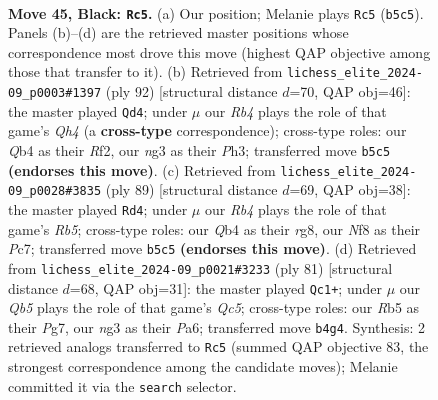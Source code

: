\documentclass[11pt]{article}
\begin{document}
\clearpage

\begin{figure}[p]\centering
\begin{subfigure}{0.46\textwidth}\centering
\resizebox{\linewidth}{!}{%
\newchessgame
\chessboard[
  setfen={3Q1nk1/1p5p/8/1r5p/1q6/6NK/R7/7R b - - 3 45},
  showmover=false,
  pgfstyle=straightmove, color=movearrow, markmove={b5-c5}
]}
\caption{}
\end{subfigure}\hfill
\begin{subfigure}{0.46\textwidth}\centering
\resizebox{\linewidth}{!}{%
\newchessgame
\chessboard[
  setfen={5rk1/6r1/2qpp3/8/2P4Q/5NPP/5RK1/8 w - - 3 47},
  showmover=false,
  pgfstyle=straightmove, color=movearrow, markmove={h4-d4}
]}
\caption{}
\end{subfigure}
\\[4pt]
\begin{subfigure}{0.46\textwidth}\centering
\resizebox{\linewidth}{!}{%
\newchessgame
\chessboard[
  setfen={6R1/1kpQN3/8/p1q1p3/1r2P3/8/6PK/8 b - - 16 45},
  showmover=false,
  pgfstyle=straightmove, color=movearrow, markmove={b4-d4}
]}
\caption{}
\end{subfigure}\hfill
\begin{subfigure}{0.46\textwidth}\centering
\resizebox{\linewidth}{!}{%
\newchessgame
\chessboard[
  setfen={8/1p4pk/p3Q3/3p4/2q5/8/1R1K1P2/7r b - - 11 41},
  showmover=false,
  pgfstyle=straightmove, color=movearrow, markmove={c4-c1}
]}
\caption{}
\end{subfigure}
\caption{\textbf{Move 45, Black: \texttt{Rc5}.} (a) Our position; Melanie plays \texttt{Rc5} (\texttt{b5c5}). Panels (b)--(d) are the retrieved master positions whose correspondence most drove this move (highest QAP objective among those that transfer to it). (b) Retrieved from \texttt{lichess\_elite\_2024-09\_p0003\#1397} (ply 92) [structural distance $d$=70, QAP obj=46]: the master played \texttt{Qd4}; under $\mu$ our \emph{Rb4} plays the role of that game's \emph{Qh4} (a \textbf{cross-type} correspondence); cross-type roles: our \emph{Q}b4 as their \emph{R}f2, our \emph{n}g3 as their \emph{P}h3; transferred move \texttt{b5c5} \textbf{(endorses this move)}. (c) Retrieved from \texttt{lichess\_elite\_2024-09\_p0028\#3835} (ply 89) [structural distance $d$=69, QAP obj=38]: the master played \texttt{Rd4}; under $\mu$ our \emph{Rb4} plays the role of that game's \emph{Rb5}; cross-type roles: our \emph{Q}b4 as their \emph{r}g8, our \emph{N}f8 as their \emph{P}c7; transferred move \texttt{b5c5} \textbf{(endorses this move)}. (d) Retrieved from \texttt{lichess\_elite\_2024-09\_p0021\#3233} (ply 81) [structural distance $d$=68, QAP obj=31]: the master played \texttt{Qc1+}; under $\mu$ our \emph{Qb5} plays the role of that game's \emph{Qc5}; cross-type roles: our \emph{R}b5 as their \emph{P}g7, our \emph{n}g3 as their \emph{P}a6; transferred move \texttt{b4g4}. Synthesis: 2 retrieved analogs transferred to \texttt{Rc5} (summed QAP objective 83, the strongest correspondence among the candidate moves); Melanie committed it via the \texttt{search} selector.}
\label{fig:thought-m89}
\end{figure}
\end{document}
